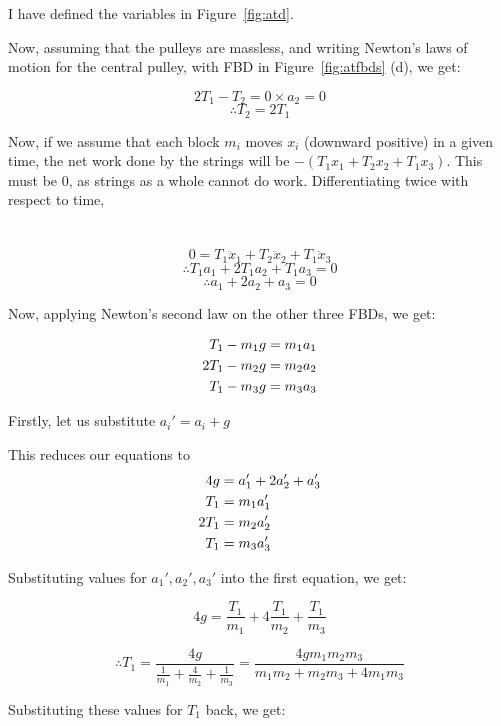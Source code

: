 \documentclass[12pt]{article}
\begin{document}
I have defined the variables in Figure~\ref{fig:atd}.

Now, assuming that the pulleys are massless, and writing Newton's laws of motion for the central pulley, with FBD in Figure~\ref{fig:atfbds} (d), we get:

$$2T_1-T_2=0\times a_2=0$$ $$ \therefore T_2=2T_1$$

Now, if we assume that each block $m_i$ moves $x_i$ (downward positive) in a given time, the net work done by the strings will be $-(T_1x_1 + T_2x_2 + T_1x_3)$. This must be 0, as strings as a whole cannot do work. Differentiating twice with respect to time,\\~\\~\\ $$0=T_1\ddot x_1 + T_2\ddot x_2 + T_1\ddot x_3$$ $$\therefore T_1a_1 +2T_1a_2+T_1a_3=0$$ $$\therefore a_1 +2a_2 + a_3 =0$$

Now, applying Newton's second law on the other three FBDs, we get:

\begin{align}
T_1-m_1g &= m_1a_1\notag\\
2T_1-m_2g &= m_2a_2\notag\\
T_1-m_3g &= m_3a_3\notag
\end{align}

Firstly, let us substitute $a_i'=a_i+g $

This reduces our equations to 
\begin{align}
4g &= a_1' +2a_2' + a_3'\notag\\
T_1 &= m_1a_1'\notag\\
2T_1 &= m_2a_2'\notag\\
T_1 &= m_3a_3'\notag
\end{align}

Substituting values for $a_1',a_2',a_3'$ into the first equation, we get:

$$4g=\frac{T_1}{m_1} + 4\frac{T_1}{m_2} + \frac{T_1}{m_3}$$

$$\therefore T_1=\frac{4g}{\frac1{m_1}+\frac4{m_2}+\frac1{m_3}}=\frac{4gm_1m_2m_3}{m_1m_2+m_2m_3 + 4m_1m_3}$$

Substituting these values for $T_1$ back, we get:

\newpage
\end{document}
